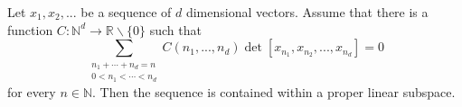 \documentclass[12pt]{article}
\newcommand{\R}{{\mathbb{R}}}
\newcommand{\N}{{\mathbb{N}}}
\begin{document}
Let $x_1,x_2,...$ be a sequence of $d$ dimensional vectors. Assume that there is a function $C \colon \N^d \to \R \smallsetminus \{0\}$
such that
\[\sum_{\substack{n_1+\cdots+n_d=n \\ 0< n_1 < \cdots < n_d }}C(n_1,...,n_d)\det[x_{n_1},x_{n_2},...,x_{n_d}] = 0 \]
for every $n \in \N$. Then the sequence is contained within a proper linear subspace.
\end{document}
